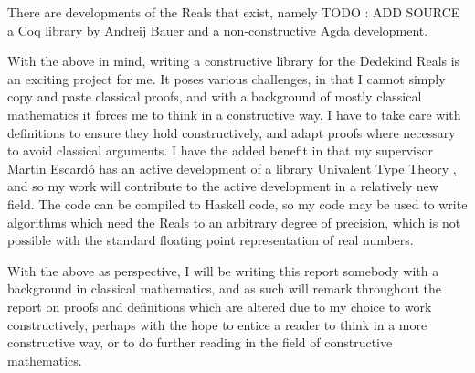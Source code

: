 \documentclass[ProjectReport]{subfiles}
\begin{document}
There are developments of the Reals that exist, namely {TODO : ADD SOURCE} a Coq library by Andreij Bauer and a non-constructive Agda development.

With the above in mind, writing a constructive library for the Dedekind Reals is an exciting project for me. It poses various challenges, in that I cannot simply copy and paste classical proofs, and with a background of mostly classical mathematics it forces me to think in a constructive way. I have to take care with definitions to ensure they hold constructively, and adapt proofs where necessary to avoid classical arguments. I have the added benefit in that my supervisor Martin Escard\'o has an active development of a library Univalent Type Theory \cite{TypeTopology}, and so my work will contribute to the active development in a relatively new field. The code can be compiled to Haskell code, so my code may be used to write algorithms which need the Reals to an arbitrary degree of precision, which is not possible with the standard floating point representation of real numbers.

With the above as perspective, I will be writing this report somebody with a background in classical mathematics, and as such will remark throughout the report on proofs and definitions which are altered due to my choice to work constructively, perhaps with the hope to entice a reader to think in a more constructive way, or to do further reading in the field of constructive mathematics.
\end{document}
